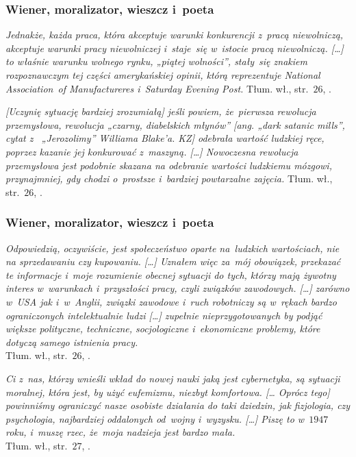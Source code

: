\documentclass[10pt,t]{beamer}
\begin{document}
\begin{frame}
  \frametitle{Wiener, moralizator, wieszcz i~poeta}


  \textit{Jednakże, każda praca, która akceptuje warunki konkurencji
    z~pracą niewolniczą, akceptuje warunki pracy niewolniczej i~staje~się
    w~istocie pracą niewolniczą. [\ldots] to właśnie warunku wolnego rynku,
    „piątej wolności”, stały~się znakiem rozpoznawczym tej części
    amerykańskiej opinii, którą reprezentuje National Association~of
    Manufactureres i~Saturday Evening Post.} Tłum. wł., str.~$26$,
  \parencite{Wiener-Cybernetics-Second-edition-Pub-2016}.

  \textit{[Uczynię sytuację bardziej zrozumiałą] jeśli powiem, że~pierwsza
    rewolucja przemysłowa, rewolucja „czarny, diabelskich młynów”
    [ang. „dark satanic mills”, cytat z~
    {„Jerozolimy”} Williama Blake’a. KZ]
    odebrała wartość ludzkiej ręce, poprzez kazanie jej konkurować
    z~maszyną. [\ldots] Nowoczesna rewolucja przemysłowa jest podobnie skazana
    na odebranie wartości ludzkiemu mózgowi, przynajmniej, gdy chodzi
    o~prostsze i~bardziej powtarzalne zajęcia.}
  Tłum. wł., str.~$26$,
  \parencite{Wiener-Cybernetics-Second-edition-Pub-2016}.

\end{frame}





\begin{frame}
  \frametitle{Wiener, moralizator, wieszcz i~poeta}


  \textit{Odpowiedzią, oczywiście, jest społeczeństwo oparte na~ludzkich
    wartościach, nie na sprzedawaniu czy kupowaniu. [\ldots] Uznałem więc
    za~mój obowiązek, przekazać te informacje i~moje rozumienie obecnej
    sytuacji do tych, którzy mają żywotny interes w~warunkach
    i~przyszłości pracy, czyli związków zawodowych. [\ldots] zarówno w~USA
    jak i~w~Anglii, związki zawodowe i~ruch robotniczy są w~rękach bardzo
    ograniczonych intelektualnie ludzi [\ldots] zupełnie nieprzygotowanych by
    podjąć większe polityczne, techniczne, socjologiczne i~ekonomiczne
    problemy, które dotyczą samego istnienia pracy.} \\
  Tłum. wł., str.~$26$,
  \parencite{Wiener-Cybernetics-Second-edition-Pub-2016}.

  \textit{Ci z~nas, którzy wnieśli wkład do nowej nauki jaką jest
    cybernetyka, są sytuacji moralnej, która jest, by użyć eufemizmu,
    niezbyt komfortowa. [\ldots{} Oprócz tego] powinniśmy ograniczyć nasze
    osobiste działania do taki dziedzin, jak fizjologia, czy psychologia,
    najbardziej oddalonych od~wojny i~wyzysku. [\ldots] Piszę to w~$1947$ roku,
    i~muszę rzec, że~moja nadzieja jest bardzo mała.} \\
  Tłum. wł., str.~$27$,
  \parencite{Wiener-Cybernetics-Second-edition-Pub-2016}.

\end{frame}
\end{document}
